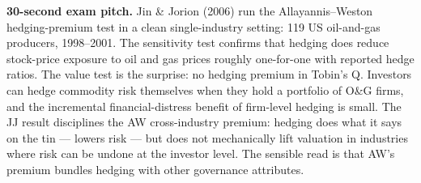 \documentclass[11pt]{article}
\begin{document}
\begin{keybox}
\textbf{30-second exam pitch.} Jin \& Jorion (2006) run the Allayannis--Weston hedging-premium test in a clean single-industry setting: 119 US oil-and-gas producers, 1998--2001. The sensitivity test confirms that hedging does reduce stock-price exposure to oil and gas prices roughly one-for-one with reported hedge ratios. The value test is the surprise: no hedging premium in Tobin's Q. Investors can hedge commodity risk themselves when they hold a portfolio of O\&G firms, and the incremental financial-distress benefit of firm-level hedging is small. The JJ result disciplines the AW cross-industry premium: hedging does what it says on the tin --- lowers risk --- but does not mechanically lift valuation in industries where risk can be undone at the investor level. The sensible read is that AW's premium bundles hedging with other governance attributes.
\end{keybox}
\end{document}
